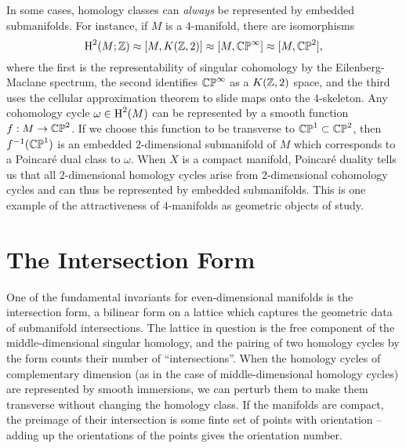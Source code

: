 \begin{remark}
	In some cases, homology classes can \emph{always} be represented by embedded submanifolds. For instance, if $M$ is a $4$-manifold, there are isomorphisms
	\begin{equation}
		\operatorname{H}^2(M; \mathbb{Z}) \approx [M, K(\mathbb{Z},2)] \approx [M, \mathbb{CP}^\infty] \approx [M,\mathbb{CP}^2],
	\end{equation}
	where the first is the representability of singular cohomology by the Eilenberg-Maclane spectrum, the second identifies $\mathbb{CP}^\infty$ as a $K(\mathbb{Z},2)$ space, and the third uses the cellular approximation theorem to slide maps onto the $4$-skeleton. Any cohomology cycle $\omega\in \operatorname{H}^2(M)$ can be represented by a smooth function $f : M \to \mathbb{CP}^2$. If we choose this function to be transverse to $\mathbb{CP}^1\subset \mathbb{CP}^2$, then $f^{-1}(\mathbb{CP}^1)$ is an embedded $2$-dimensional submanifold of $M$ which corresponds to a Poincar\'e dual class to $\omega$. When $X$ is a compact manifold, Poincar\'e duality tells us that all $2$-dimensional homology cycles arise from $2$-dimensional cohomology cycles and can thus be represented by embedded submanifolds. This is one example of the attractiveness of $4$-manifolds as geometric objects of study.
\end{remark}


\pagebreak
\section{The Intersection Form}\label{sec:intersection-form}

One of the fundamental invariants for even-dimensional manifolds is the intersection form, a bilinear form on a lattice which captures the geometric data of submanifold intersections. The lattice in question is the free component of the middle-dimensional singular homology, and the pairing of two homology cycles by the form counts their number of ``intersections''. When the homology cycles of complementary dimension (as in the case of middle-dimensional homology cycles) are represented by smooth immersions, we can perturb them to make them transverse without changing the homology class. If the manifolds are compact, the preimage of their intersection is some finte set of points with orientation -- adding up the orientations of the points gives the orientation number.

